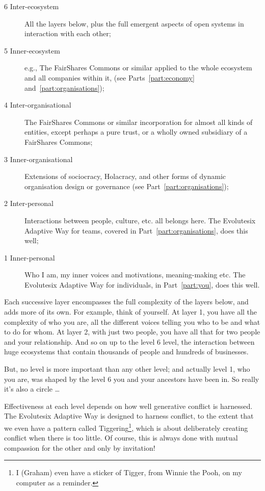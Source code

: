 \begin{description}                                                                                                                                             
\item[6 Inter-ecosystem] All the layers below, plus the full emergent aspects of open systems in interaction with each other;
\item[5 Inner-ecosystem] e.g., The FairShares Commons or similar applied to the whole ecosystem and all companies within it, (see Parts~\ref{part:economy} and~\ref{part:organisations});
\item[4 Inter-organisational] The FairShares Commons or similar incorporation for almost all kinds of entities, except perhaps a pure trust, or a wholly owned subsidiary of a FairShares Commons;
\item[3 Inner-organisational] Extensions of sociocracy, Holacracy, and other forms of dynamic organisation design or governance (see Part~\ref{part:organisations});
\item[2 Inter-personal] Interactions between people, culture, etc. all belongs here. The Evolutesix Adaptive Way for teams, covered in Part~\ref{part:organisations}, does this well;
\item[1 Inner-personal] Who I am, my inner voices and motivations, meaning-making etc. The Evolutesix Adaptive Way for individuals, in Part~\ref{part:you}, does this well.
\label{list:six-layers}
\end{description}


Each successive layer encompasses the full complexity of the layers below, and adds more of its own. For example, think of yourself. At layer 1, you have all the complexity of who you are, all the different voices telling you who to be and what to do for whom. At layer 2, with just two people, you have all that for two people and your relationship. And so on up to the level 6 level, the interaction between huge ecosystems that contain thousands of people and hundreds of businesses.


But, no level is more important than any other level; and actually level 1, who you are, was shaped by the level 6 you and your ancestors have been in. So really it’s also a circle \ldots 


Effectiveness at each level depends on how well generative conflict is harnessed. The Evolutesix  Adaptive Way is designed to harness conflict, to the extent that we even have a pattern called Tiggering\footnote{I (Graham) even have a sticker of Tigger, from Winnie the Pooh, on my computer as a reminder.}, which is about deliberately creating conflict when there is too little. Of course, this is always done with mutual compassion for the other and only by invitation!


